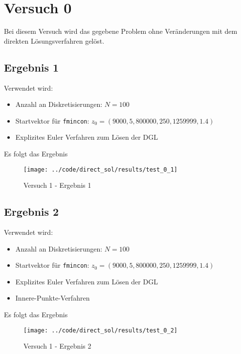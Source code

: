 \newpage
\section{Versuch 0}\label{kap:Versuch0}
Bei diesem Versuch wird das gegebene Problem ohne Veränderungen mit dem direkten Lösungsverfahren gelöst.

\subsection{Ergebnis 1}\label{kap:Versuch01}
Verwendet wird:
\begin{itemize}
\item Anzahl an Diskretisierungen: $N = 100$ 
\item Startvektor für \texttt{fmincon}: $z_0 = (9000,5,800000,250,1259999,1.4)$
\item Explizites Euler Verfahren zum Lösen der DGL
\end{itemize}
Es folgt das Ergebnis
\begin{figure}[H]
\begin{center}
\texttt{[image: ../code/direct\_sol/results/test\_0\_1]}
\caption{Versuch 1 - Ergebnis 1}\label{img:test_0_1}
\end{center}
\end{figure}

\newpage
\subsection{Ergebnis 2}\label{kap:Versuch02}
Verwendet wird:
\begin{itemize}
\item Anzahl an Diskretisierungen: $N = 100$ 
\item Startvektor für \texttt{fmincon}: $z_0 = (9000,5,800000,250,1259999,1.4)$
\item Explizites Euler Verfahren zum Lösen der DGL
%
\item Innere-Punkte-Verfahren
\end{itemize}
Es folgt das Ergebnis
\begin{figure}[H]
\begin{center}
\texttt{[image: ../code/direct\_sol/results/test\_0\_2]}
\caption{Versuch 1 - Ergebnis 2}\label{img:test_0_2}
\end{center}
\end{figure}













